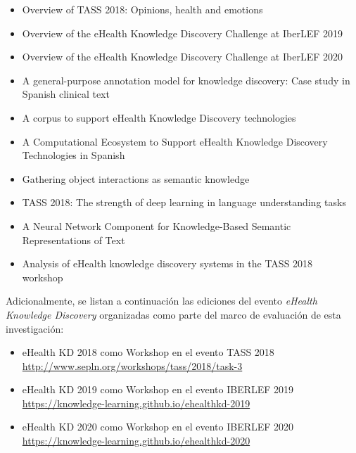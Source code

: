 \begin{itemize}
    \item Overview of TASS 2018: Opinions, health and emotions~\cite{tamartinez2018overview}
    \item Overview of the eHealth Knowledge Discovery Challenge at IberLEF 2019~\cite{tapiad2019overview}
    \item Overview of the eHealth Knowledge Discovery Challenge at IberLEF 2020~\cite{piad2020overview}
    \item A general-purpose annotation model for knowledge discovery: Case study in Spanish clinical text~\cite{tapiad2019general}
    \item A corpus to support eHealth Knowledge Discovery technologies~\cite{piad2019corpus}
    \item A Computational Ecosystem to Support eHealth Knowledge Discovery Technologies in Spanish~\cite{piad2020computational}
    \item Gathering object interactions as semantic knowledge~\cite{taestevez2018gathering}
    \item TASS 2018: The strength of deep learning in language understanding tasks~\cite{tass}
    \item A Neural Network Component for Knowledge-Based Semantic Representations of Text~\cite{tapiad2019neural}
    \item Analysis of eHealth knowledge discovery systems in the TASS 2018 workshop~\cite{taalejandro2019analysis}
\end{itemize}

Adicionalmente, se listan a continuación las ediciones del evento \textit{eHealth Knowledge Discovery} organizadas como parte del marco de evaluación de esta investigación:

\begin{itemize}
    \item eHealth KD 2018 como Workshop en el evento TASS 2018\\ \url{http://www.sepln.org/workshops/tass/2018/task-3}
    \item eHealth KD 2019 como Workshop en el evento IBERLEF 2019\\ \url{https://knowledge-learning.github.io/ehealthkd-2019}
    \item eHealth KD 2020 como Workshop en el evento IBERLEF 2020\\ \url{https://knowledge-learning.github.io/ehealthkd-2020}
\end{itemize}